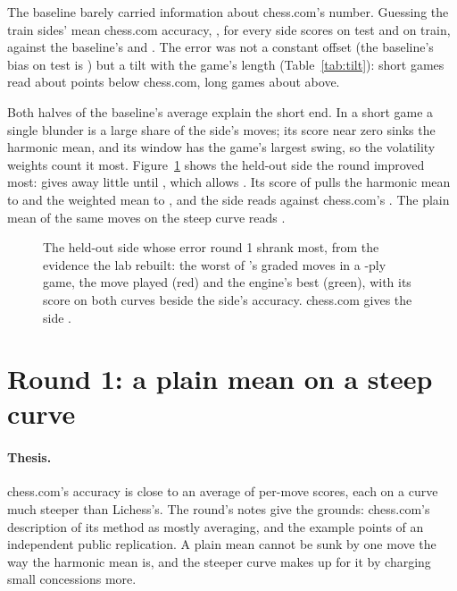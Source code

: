 \documentclass[11pt]{article}
\begin{document}
The baseline barely carried information about chess.com's number. Guessing the train sides'
mean chess.com accuracy, \ConstantGuess, for every side scores \ConstantTestMae{} on test and
\ConstantTrainMae{} on train, against the baseline's \BaseTestMae{} and \BaseTrainMae. The error
was not a constant offset (the baseline's bias on test is \BaseTestBias) but a tilt with the
game's length (Table~\ref{tab:tilt}): short games read about \TiltBaseShort{} points below
chess.com, long games about \TiltBaseLong{} above.

Both halves of the baseline's average explain the short end. In a short game a single blunder is
a large share of the side's moves; its score near zero sinks the harmonic mean, and its window
has the game's largest swing, so the volatility weights count it most. Figure~\ref{fig:example}
shows the held-out side the round improved most: \ExampleSide{} gives away little until
\ExampleWorst, which allows \ExampleAfter. Its score of \ExampleWorstBase{} pulls the harmonic mean
to \ExampleHarmonic{} and the weighted mean to \ExampleWeighted, and the side reads
\ExampleBase{} against chess.com's \ExampleChessCom. The plain mean of the same moves on the
steep curve reads \ExampleApp.

\begin{figure}[!htbp]
\ExampleGame
\caption{The held-out side whose error round 1 shrank most, from the evidence the lab rebuilt:
the worst of \ExampleSide's \ExampleGraded{} graded moves in a \ExamplePlies-ply game, the move
played (red) and the engine's best (green), with its score on both curves beside the side's
accuracy. chess.com gives the side \ExampleChessCom.}
\label{fig:example}
\end{figure}

\begin{table}[!htbp]
\centering\small
\TiltTable
\caption{Mean signed error (the app's accuracy less chess.com's) by the game's length, over all
\Games{} games' sides, routine evidence.}
\label{tab:tilt}
\end{table}

\section{Round 1: a plain mean on a steep curve}

\paragraph{Thesis.} chess.com's accuracy is close to an average of per-move scores, each
on a curve much steeper than Lichess's. The round's notes give the grounds: chess.com's
description of its method as mostly averaging, and the example points of an independent public
replication. A plain mean cannot be sunk by one move the way the harmonic mean is, and the
steeper curve makes up for it by charging small concessions more.
\end{document}
